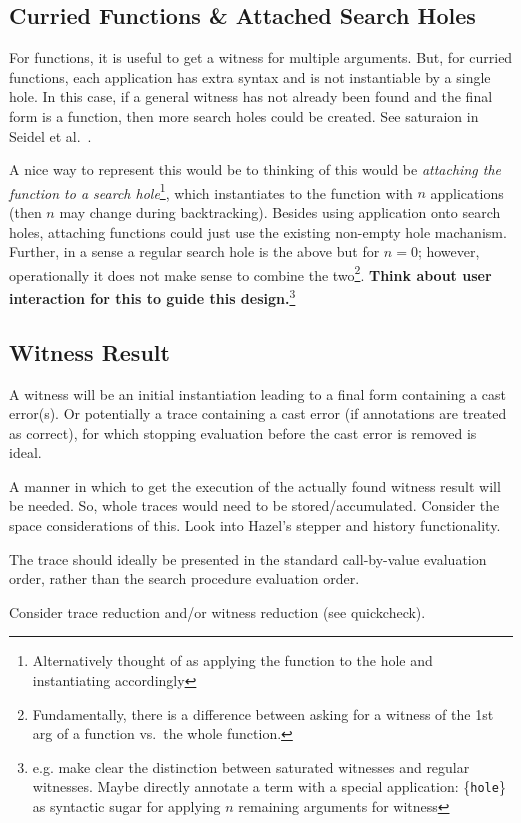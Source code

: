 \subsection{Curried Functions \& Attached Search Holes}
For functions, it is useful to get a witness for multiple arguments. But, for curried functions, each application has extra syntax and is not instantiable by a single hole. In this case, if a general witness has not already been found and the final form is a function, then more search holes could be created. See saturaion in Seidel et al.\ \cite{SearchProc}.\par 
A nice way to represent this would be to thinking of this would be \textit{attaching the function to a search hole}\footnote{Alternatively thought of as applying the function to the hole and instantiating accordingly}, which instantiates to the function with $n$ applications (then $n$ may change during backtracking). Besides using application onto search holes, attaching functions could just use the existing non-empty hole machanism. Further, in a sense a regular search hole is the above but for $n=0$; however, operationally it does not make sense to combine the two\footnote{Fundamentally, there is a difference between asking for a witness of the 1st arg of a function vs.\ the whole function.}. \textbf{Think about user interaction for this to guide this design.}\footnote{e.g. make clear the distinction between saturated witnesses and regular witnesses. Maybe directly annotate a term with a special application: \{\texttt{hole}\} as syntactic sugar for applying $n$ remaining arguments for witness}

\subsection{Witness Result}
A witness will be an initial instantiation leading to a  final form containing a cast error(s). Or potentially a trace containing a cast error (if annotations are treated as correct), for which stopping evaluation before the cast error is removed is ideal. 
\par
A manner in which to get the execution of the actually found witness result will be needed. So, whole traces would need to be stored/accumulated. Consider the space considerations of this. Look into Hazel's stepper and history functionality.\par 
The trace should ideally be presented in the standard call-by-value evaluation order, rather than the search procedure evaluation order.\par 
Consider trace reduction and/or witness reduction (see quickcheck).

